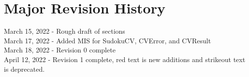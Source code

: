 \documentclass[11pt]{article}
\begin{document}
\begin{itemize}
    \end{itemize}
    
    
\section{Major Revision History}
March 15, 2022 - Rough draft of sections\\
March 17, 2022 - Added MIS for SudokuCV, CVError, and CVResult \\
March 18, 2022 - Revision 0 complete \\
April 12, 2022 - Revision 1 complete, red text is new additions and strikeout text is deprecated.

			
\end{document}

